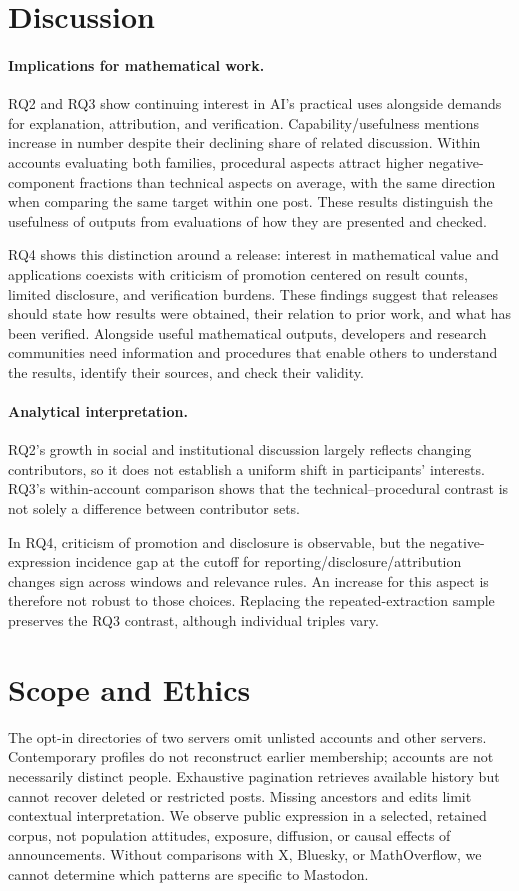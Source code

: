 \documentclass[sigconf,balance=false]{acmart}
\begin{document}
\section{Discussion}
\paragraph{Implications for mathematical work.}
RQ2 and RQ3 show continuing interest in AI's practical uses alongside demands for explanation, attribution, and verification. Capability/usefulness mentions increase in number despite their declining share of related discussion. Within accounts evaluating both families, procedural aspects attract higher negative-component fractions than technical aspects on average, with the same direction when comparing the same target within one post. These results distinguish the usefulness of outputs from evaluations of how they are presented and checked.

RQ4 shows this distinction around a release: interest in mathematical value and applications coexists with criticism of promotion centered on result counts, limited disclosure, and verification burdens. These findings suggest that releases should state how results were obtained, their relation to prior work, and what has been verified. Alongside useful mathematical outputs, developers and research communities need information and procedures that enable others to understand the results, identify their sources, and check their validity.

\paragraph{Analytical interpretation.}
RQ2's growth in social and institutional discussion largely reflects changing contributors, so it does not establish a uniform shift in participants' interests. RQ3's within-account comparison shows that the technical--procedural contrast is not solely a difference between contributor sets.

In RQ4, criticism of promotion and disclosure is observable, but the negative-expression incidence gap at the cutoff for reporting/disclosure/attribution changes sign across windows and relevance rules. An increase for this aspect is therefore not robust to those choices. Replacing the repeated-extraction sample preserves the RQ3 contrast, although individual triples vary.

\section{Scope and Ethics}
The opt-in directories of two servers omit unlisted accounts and other servers. Contemporary profiles do not reconstruct earlier membership; accounts are not necessarily distinct people. Exhaustive pagination retrieves available history but cannot recover deleted or restricted posts. Missing ancestors and edits limit contextual interpretation. We observe public expression in a selected, retained corpus, not population attitudes, exposure, diffusion, or causal effects of announcements. Without comparisons with X, Bluesky, or MathOverflow, we cannot determine which patterns are specific to Mastodon.
\end{document}

